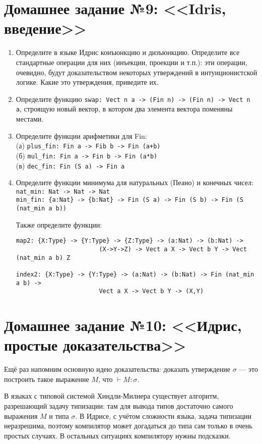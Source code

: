 \documentclass[10pt,a4paper,oneside]{article}
\begin{document}
\section*{Домашнее задание №9: <<Idris, введение>>}
\begin{enumerate}
\item Определите в языке Идрис конъюнкцию и дизъюнкцию.
Определите все стандартные операции для них (инъекции, проекции и т.п.):
эти операции, очевидно, будут доказательством некоторых утверждений в интуиционистской
логике. Какие это утверждения, приведите их.

\item Определите функцию \verb!swap: Vect n a -> (Fin n) -> (Fin n) -> Vect n a!,
строящую новый вектор, в котором два элемента вектора поменяны местами.

\item Определите функции арифметики для Fin:\\
(а) \verb!plus_fin: Fin a -> Fib b -> Fin (a+b)!\\
(б) \verb!mul_fin: Fin a -> Fin b -> Fin (a*b)!\\
(в) \verb!dec_fin: Fin (S a) -> Fin a!

\item Определите функции минимума для натуральных (Пеано) и конечных чисел:\\
\verb!nat_min: Nat -> Nat -> Nat!\\
\verb!min_fin: {a:Nat} -> {b:Nat} -> Fin (S a) -> Fin (S b) -> Fin (S (nat_min a b))!

Также определите функции:
\begin{verbatim}
map2: {X:Type} -> {Y:Type} -> {Z:Type} -> (a:Nat) -> (b:Nat) -> 
                       (X->Y->Z) -> Vect a X -> Vect b Y -> Vect (nat_min a b) Z

index2: {X:Type} -> {Y:Type} -> (a:Nat) -> (b:Nat) -> Fin (nat_min a b) ->
                       Vect a X -> Vect b Y -> (X,Y)
\end{verbatim}

\end{enumerate}

\section*{Домашнее задание №10: <<Идрис, простые доказательства>>}
Ещё раз напомним основную идею доказательства:
доказать утверждение $\sigma$ --- это построить такое выражение $M$,
что $\vdash M:\sigma$.

В языках с типовой системой Хиндли-Милнера существует алгоритм, разрешающий
задачу типизации: там для вывода типов достаточно самого выражения $M$ и 
типа $\sigma$. В Идрисе, с учётом сложности языка, задача типизации неразрешима,
поэтому компилятор может догадаться до типа сам только в очень простых случаях.
В остальных ситуациях компилятору нужны подсказки.
\end{document}
